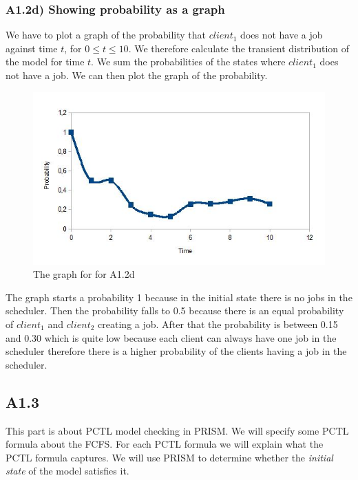 \documentclass[12pt]{report}
\begin{document}
\subsubsection*{A1.2d) Showing probability as a graph}
We have to plot a graph of the probability that $client_1$ does not have a job against time $t$, for $0 \leq t \leq 10$. We therefore calculate the transient distribution of the model for time $t$. We sum the probabilities of the states where $client_1$ does not have a job. We can then plot the graph of the probability.\\
\begin{figure}[H]
	\centering
	\includegraphics[scale=0.9]{../GFX/A1-2d.png}
	\caption{The graph for for A1.2d}
\end{figure}
The graph starts a probability 1 because in the initial state there is no jobs in the scheduler. Then the probability falls to 0.5 because there is an equal probability of $client_1$ and $client_2$ creating a job. After that the probability is between 0.15 and 0.30 which is quite low because each client can always have one job in the scheduler therefore there is a higher probability of the clients having a job in the scheduler.

\subsection*{A1.3}
This part is about PCTL model checking in PRISM. We will specify some PCTL formula about the FCFS. For each PCTL formula we will explain what the PCTL formula captures. We will use PRISM to determine whether the \emph{initial state} of the model satisfies it.
\end{document}

